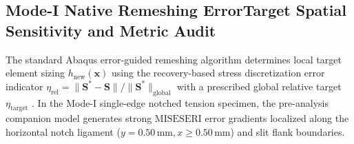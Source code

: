 \subsection{Mode-I Native Remeshing ErrorTarget Spatial Sensitivity and Metric Audit}
\label{subsec:stage14uap_mode1_sensitivity}

The standard Abaqus error-guided remeshing algorithm determines local target element sizing $h_{\mathrm{new}}(\mathbf{x})$ using the recovery-based stress discretization error indicator $\eta_{\mathrm{rel}} = \| \mathbf{S}^* - \mathbf{S} \| / \| \mathbf{S}^* \|_{\mathrm{global}}$ with a prescribed global relative target $\eta_{\mathrm{target}}$ \citep{zienkiewicz1987}. In the Mode-I single-edge notched tension specimen, the pre-analysis companion model generates strong $\mathrm{MISESERI}$ error gradients localized along the horizontal notch ligament ($y = 0.50\,\mathrm{mm}, x \ge 0.50\,\mathrm{mm}$) and slit flank boundaries.

